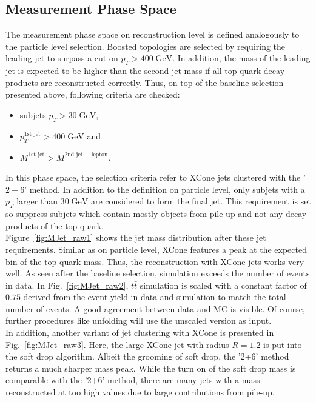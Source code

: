 \FloatBarrier %
\subsection{Measurement Phase Space}
\label{sec:FinalSel}
	The measurement phase space on reconstruction level is defined analogously to the particle level selection. Boosted topologies are selected by requiring the leading jet to surpass a cut on $p_T > 400\;\text{GeV}$. In addition, the mass of the leading jet is expected to be higher than the second jet mass if all top quark decay products are reconstructed correctly. Thus, on top of the baseline selection presented above, following criteria are checked:
	\begin{itemize}
	\item subjets $p_T > 30\;\text{GeV}$,
	\item $p_T^{\text{1st jet}} > 400\;\text{GeV}$ and
	\item $M^{\text{1st jet}} > M^{\text{2nd jet + lepton}}$.
	\end{itemize}
	In this phase space, the selection criteria refer to XCone jets clustered with the '$2+6$' method.	In addition to the definition on particle level, only subjets with a $p_T$ larger than $30\;\text{GeV}$ are considered to form the final jet. This requirement is set so suppress subjets which contain mostly objects from pile-up and not any decay products of the top quark.\\
	Figure~\ref{fig:MJet_raw1} shows the jet mass distribution after these jet requirements. Similar as on particle level, XCone features a peak at the expected bin of the top quark mass. Thus, the reconstruction with XCone jets works very well. As seen after the baseline selection, simulation exceeds the number of events in data. In Fig.~\ref{fig:MJet_raw2}, $t\bar{t}$ simulation is scaled with a constant factor of $0.75$ derived from the event yield in data and simulation to match the total number of events. A good agreement between data and MC is visible. Of course, further procedures like unfolding will use the unscaled version as input.\\
	In addition, another variant of jet clustering with XCone is presented in Fig.~\ref{fig:MJet_raw3}. Here, the large XCone jet with radius $R=1.2$ is put into the soft drop algorithm. Albeit the grooming of soft drop, the '2+6' method returns a much sharper mass peak. While the turn on of the soft drop mass is comparable with the '2+6' method, there are many jets with a mass reconstructed at too high values due to large contributions from pile-up.
